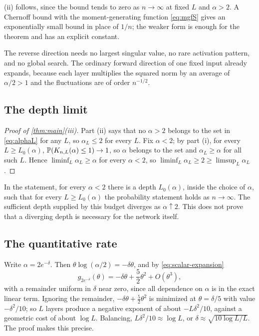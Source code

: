 (ii) follows, since the bound tends to zero as $n\to\infty$ at fixed $L$ and $\alpha>2$. A Chernoff bound with the moment-generating function \cref{eq:mgfS} gives an exponentially small bound in place of $1/n$; the weaker form is enough for the theorem and has an explicit constant.

\begin{remark}
The reverse direction needs no largest singular value, no rare activation pattern, and no global search. The ordinary forward direction of one fixed input already expands, because each layer multiplies the squared norm by an average of $\alpha/2>1$ and the fluctuations are of order $n^{-1/2}$.
\end{remark}

\subsection{The depth limit}

\begin{proof}[Proof of \cref{thm:main}(iii)]
Part (ii) says that no $\alpha>2$ belongs to the set in \cref{eq:alphaL} for any $L$, so $\alpha_L\le2$ for every $L$. Fix $\alpha<2$; by part (i), for every $L\ge L_0(\alpha)$, $\mathbb{P}(K_{n,L}(\alpha)\le1)\to1$, so $\alpha$ belongs to the set and $\alpha_L\ge\alpha$ for all such $L$. Hence $\liminf_L\alpha_L\ge\alpha$ for every $\alpha<2$, so $\liminf_L\alpha_L\ge2\ge\limsup_L\alpha_L$.
\end{proof}

In the statement, for every $\alpha<2$ there is a depth $L_0(\alpha)$, inside the choice of $\alpha$, such that for every $L\ge L_0(\alpha)$ the probability statement holds as $n\to\infty$. The sufficient depth supplied by this budget diverges as $\alpha\uparrow2$. This does not prove that a diverging depth is necessary for the network itself.

\subsection{The quantitative rate}

Write $\alpha=2e^{-\delta}$. Then $\theta\log(\alpha/2)=-\delta\theta$, and by \cref{eq:scalar-expansion}
\begin{equation}\label{eq:scalar-delta}
g_{2e^{-\delta}}(\theta)=-\delta\theta+\frac52\theta^2+O(\theta^3),
\end{equation}
with a remainder uniform in $\delta$ near zero, since all dependence on $\alpha$ is in the exact linear term. Ignoring the remainder, $-\delta\theta+\frac52\theta^2$ is minimized at $\theta=\delta/5$ with value $-\delta^2/10$; so $L$ layers produce a negative exponent of about $-L\delta^2/10$, against a geometric cost of about $\log L$. Balancing, $L\delta^2/10\approx\log L$, or $\delta\approx\sqrt{10\log L/L}$. The proof makes this precise.

